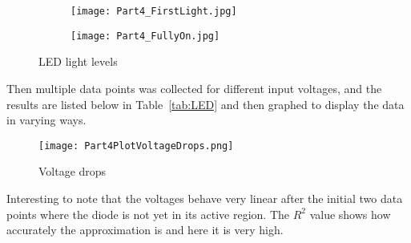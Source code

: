 \documentclass{article}
\begin{document}
\vspace{2em}

\begin{figure}[h] %
    \centering
    \begin{subfigure}[t]{0.49\textwidth}
        \centering
        \texttt{[image: Part4\_FirstLight.jpg]}
        \label{fig:FirstLight}
    \end{subfigure}
    \hfill
    \begin{subfigure}[t]{0.49\textwidth}
        \centering
        \texttt{[image: Part4\_FullyOn.jpg]}
        \label{fig:Bright}
    \end{subfigure}
    \caption{LED light levels}
    \label{fig:Part4States}
\end{figure}

Then multiple data points was collected for different input voltages, and the results are listed below in Table~\ref{tab:LED} and then graphed to display the data in varying ways.

\begin{table}[htbp] %
  \centering
  \caption{LED values}
  \label{tab:LED}%
\end{table}

\clearpage

\begin{figure}[h] %
\centering
\texttt{[image: Part4PlotVoltageDrops.png]}
\caption{Voltage drops}
\label{fig:part4voltage}
\end{figure}
Interesting to note that the voltages behave very linear after the initial two data points where the diode is not yet in its active region. The \(R^2\) value shows how accurately the approximation is and here it is very high.
\clearpage
\end{document}
